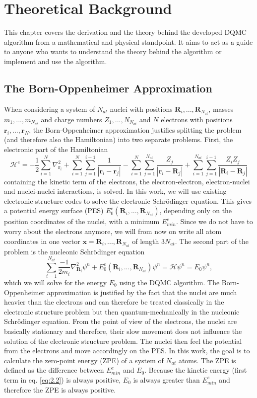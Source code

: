 \documentclass [12pt]{report}
\begin{document}
\chapter{Theoretical Background}
This chapter covers the derivation and the theory behind the developed DQMC algorithm from a mathematical and physical standpoint. It aims to act as a guide to anyone who wants to understand the theory behind the algorithm or implement and use the algorithm.

\section{The Born-Oppenheimer Approximation}
When considering a system of $N_{at}$ nuclei with positions $\bm{R}_i,...,\bm{R}_{N_{at}}$, masses $m_1,...,m_{N_{at}}$ and charge numbers $Z_1,...,N_{N_{at}}$ and $N$ electrons with positions $\bm{r}_i,...,\bm{r}_{N}$, the Born-Oppenheimer approximation justifies splitting the problem (and therefore also the Hamiltonian) into two separate problems. First, the electronic part of the Hamiltonian
\begin{equation}
\mathcal{H}^e = - \frac{1}{2}\sum_{i=1}^N \nabla^2_{\bm{r}_i}  + \sum_{i=1}^{N} \sum_{j=1}^{i-1} \frac{1}{|\bm{r}_i-\bm{r}_j|} - \sum_{i=1}^{N} \sum_{j=1}^{N_{at}} \frac{Z_j}{|\bm{r}_i-\bm{R}_j|} + \sum_{i=1}^{N_{at}} \sum_{j=1}^{i-1} \frac{Z_i Z_j}{|\bm{R}_i-\bm{R}_j|}
\end{equation}
containing the kinetic term of the electrons, the electron-electron, electron-nuclei and nuclei-nuclei interactions, is solved. In this work, we will use existing electronic structure codes to solve the electronic Schrödinger equation. This gives a potential energy surface (PES) $E_0^e(\bm{R}_i,...,\bm{R}_{N_{at}})$, depending only on the position coordinates of the nuclei, with a minimum $E_{min}^e$. Since we do not have to worry about the electrons anymore, we will from now on write all atom coordinates in one vector $\bm{x} = \bm{R}_i,...,\bm{R}_{N_{at}}$ of length $3N_{at}$.
The second part of the problem is the nucleonic Schrödinger equation
\begin{equation} \label{eq:2.2}
\sum_{i=1}^{N_{at}} \frac{-1}{2m_i} \nabla^2_{\bm{R_i}} \psi^n + E_0^e(\bm{R}_i,...,\bm{R}_{N_{at}}) \psi^n = \mathcal{H} \psi^n = E_0 \psi^n,
\end{equation}
which we will solve for the energy $E_0$ using the DQMC algorithm. The Born-Oppenheimer approximation is justified by the fact that the nuclei are much heavier than the electrons and can therefore be treated classically in the electronic structure problem but then quantum-mechanically in the nucleonic Schrödinger equation. From the point of view of the electrons, the nuclei are basically stationary and therefore, their slow movement does not influence the solution of the electronic structure problem. The nuclei then feel the potential from the electrons and move accordingly on the PES.
In this work, the goal is to calculate the zero-point energy (ZPE) of a system of $N_{at}$ atoms. The ZPE is defined as the difference between $E_{min}^e$ and $E_0$. Because the kinetic energy (first term in eq. \eqref{eq:2.2}) is always positive, $E_0$ is always greater than $E_{min}^e$ and therefore the ZPE is always positive.
\end{document}
